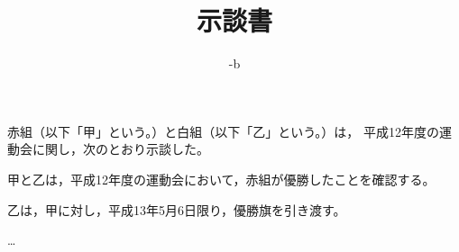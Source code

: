 \documentclass[a4paper,papersize,12pt]{jsarticle}
\begin{document}
\title{示談書}

\date[l]{-b}

\maketitle[t]

\sectionZ{}

赤組（以下「甲」という。）と白組（以下「乙」という。）は，
平成12年度の運動会に関し，次のとおり示談した。



甲と乙は，平成12年度の運動会において，赤組が優勝したことを確認する。


乙は，甲に対し，平成13年5月6日限り，優勝旗を引き渡す。

\stateZ\noindent
…

\sectionZ{}

\printdate


~
\noindent~~


~
\noindent~~
\end{document}
